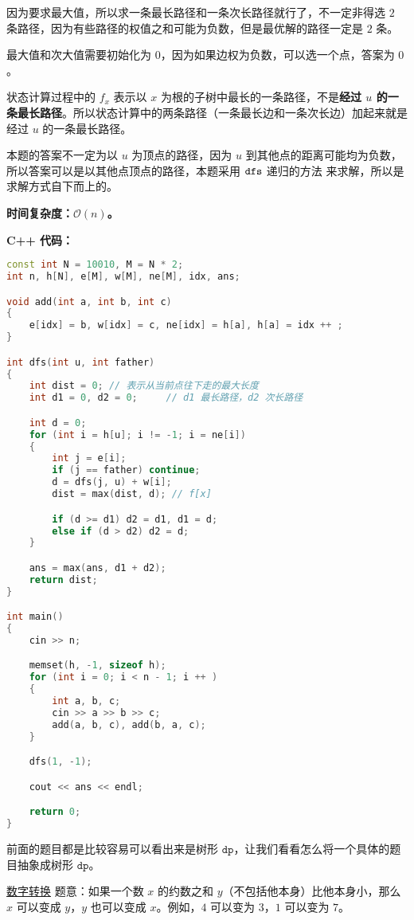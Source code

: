 因为要求最大值，所以求一条最长路径和一条次长路径就行了，不一定非得选 $2$ 条路径，因为有些路径的权值之和可能为负数，但是最优解的路径一定是 $2$ 条。

最大值和次大值需要初始化为 $0$，因为如果边权为负数，可以选一个点，答案为 $0$。

状态计算过程中的 $f_x$ 表示以 $x$ 为根的子树中最长的一条路径，不是\textbf{经过 $u$ 的一条最长路径}。所以状态计算中的两条路径（一条最长边和一条次长边）加起来就是经过 $u$ 的一条最长路径。

本题的答案不一定为以 $u$ 为顶点的路径，因为 $u$ 到其他点的距离可能均为负数，所以答案可以是以其他点顶点的路径，本题采用 $\tt dfs$ 递归的方法 来求解，所以是求解方式自下而上的。

\textbf{时间复杂度：$\mathcal{O}(n)$。}

\textbf{C++ 代码：}

\begin{lstlisting}[language=cpp]
const int N = 10010, M = N * 2;
int n, h[N], e[M], w[M], ne[M], idx, ans;

void add(int a, int b, int c)
{
    e[idx] = b, w[idx] = c, ne[idx] = h[a], h[a] = idx ++ ;
}

int dfs(int u, int father)
{
    int dist = 0; // 表示从当前点往下走的最大长度
    int d1 = 0, d2 = 0;     // d1 最长路径，d2 次长路径

    int d = 0;
    for (int i = h[u]; i != -1; i = ne[i])
    {
        int j = e[i];
        if (j == father) continue;
        d = dfs(j, u) + w[i];
        dist = max(dist, d); // f[x]

        if (d >= d1) d2 = d1, d1 = d;
        else if (d > d2) d2 = d;
    }

    ans = max(ans, d1 + d2);
    return dist;
}

int main()
{
    cin >> n;

    memset(h, -1, sizeof h);
    for (int i = 0; i < n - 1; i ++ )
    {
        int a, b, c;
        cin >> a >> b >> c;
        add(a, b, c), add(b, a, c);
    }

    dfs(1, -1);

    cout << ans << endl;

    return 0;
}
\end{lstlisting}

前面的题目都是比较容易可以看出来是树形 $\texttt{dp}$，让我们看看怎么将一个具体的题目抽象成树形 $\texttt{dp}$。

\href{http://ybt.ssoier.cn:8088/problem_show.php?pid=1577}{数字转换} 题意：如果一个数 $x$ 的约数之和 $y$（不包括他本身）比他本身小，那么 $x$ 可以变成 $y$，$y$ 也可以变成 $x$。例如，$4$ 可以变为 $3$，$1$ 可以变为 $7$。


